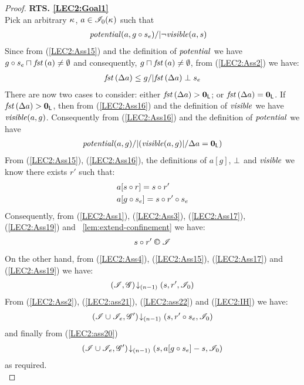 \begin{lemma}
\begin{proof}
\noindent\textbf{RTS. \ref{LEC2:Goal1}}\\
Pick an arbitrary $\kappa_{}$, $a \in \mathscr{I}_0(\kappa_{})$ such that
%
\begin{align}
	& \mathit{potential}(a, g \circ s_e) /| \neg\mathit{visible}(a, s) \label{LEC2:Ass15}
\end{align}
Since from (\ref{LEC2:Ass15}) and the definition of $\mathit{potential}$ we have $g \circ s_e \sqcap_{} \mathit{fst}\left(a\right) \not= \emptyset$ and consequently, $g \sqcap_{} \mathit{fst}\left(a\right) \not= \emptyset$, from (\ref{LEC2:Ass2}) we have:
%
\begin{align}
	\mathit{fst}\left(\Delta {a}\right) \leq g /| \mathit{fst}\left(\Delta {a}\right) \mathrel{\bot} s_e \label{LEC2:Ass16}
\end{align}
% 
There are now two cases to consider: either $\mathit{fst}\left(\Delta {a}\right) > \mathbf{0}_{\textsf{L}}$; or $\mathit{fst}\left(\Delta {a}\right) = \mathbf{0}_{\textsf{L}}$.
If $\mathit{fst}\left(\Delta {a}\right) > \mathbf{0}_{\textsf{L}}$, then from (\ref{LEC2:Ass16}) and the definition of $\mathit{visible}$ we have $\mathit{visible}(a, g)$. Consequently from (\ref{LEC2:Ass16}) and the definition of $\mathit{potential}$ we have
%
\begin{align}
	\mathit{potential}(a, g) /| (\mathit{visible}(a, g) |/ \Delta {a} = \mathbf{0}_{\textsf{L}}) \label{LEC2:Ass17}
\end{align}
From (\ref{LEC2:Ass15}), (\ref{LEC2:Ass16}), the definitions of $a[g]$, $\mathrel{\bot}$ and $\mathit{visible}$ we know there exists $r'$ such that: 
%
\begin{align}
	& a[s \circ r] = s \circ r' \label{LEC2:Ass19}\\
	& a[g \circ s_e] = s \circ r' \circ s_e \label{LEC2:ass20}
\end{align}
%
Consequently, from (\ref{LEC2:Ass1}), (\ref{LEC2:Ass3}), (\ref{LEC2:Ass17}), (\ref{LEC2:Ass19}) and \lem~\ref{lem:extend-confinement} we have:
%
\begin{align}
	s \composeL r' \confines \lmod  \label{LEC2:ass21}
\end{align}
%
On the other hand, from (\ref{LEC2:Ass4}), (\ref{LEC2:Ass15}), (\ref{LEC2:Ass17}) and (\ref{LEC2:Ass19}) we have:
%
\begin{align}
	\left(\mathscr{I}, \mathscr{G}\right) \!\downarrow_{(n-1)} \left(s, r', \mathscr{I}_0\right) \label{LEC2:ass22}
\end{align}
From (\ref{LEC2:Ass2}), (\ref{LEC2:ass21}), (\ref{LEC2:ass22}) and (\ref{LEC2:IH}) we have:
%
\begin{align*}
	\left(\mathscr{I} \cup \mathscr{I}_{e}, \mathscr{G}'\right) \!\downarrow_{(n-1)} \left(s, r' \circ s_e, \mathscr{I}_0\right)
\end{align*}
%
and finally from (\ref{LEC2:ass20})
%
\begin{align*}
	\left(\mathscr{I} \cup \mathscr{I}_{e}, \mathscr{G}'\right) \!\downarrow_{(n-1)} \left(s, a[g \circ s_e] - s, \mathscr{I}_0\right)
\end{align*}
%
as required.\\
%
%
%


\end{proof}
\end{lemma}
